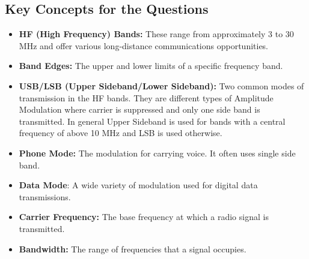\subsection*{Key Concepts for the Questions}
\begin{itemize}
    \item \textbf{HF (High Frequency) Bands:} These range from approximately 3 to 30 MHz and offer various long-distance communications opportunities.
    \item \textbf{Band Edges:}  The upper and lower limits of a specific frequency band.
    \item \textbf{USB/LSB (Upper Sideband/Lower Sideband):} Two common modes of transmission in the HF bands. They are different types of Amplitude Modulation where carrier is suppressed and only one side band is transmitted. In general Upper Sideband is used for bands with a central frequency of above 10 MHz and LSB is used otherwise.
    \item \textbf{Phone Mode:} The modulation for carrying voice. It often uses single side band.
    \item \textbf{Data Mode}: A wide variety of modulation used for digital data transmissions.
    \item \textbf{Carrier Frequency:} The base frequency at which a radio signal is transmitted.
    \item \textbf{Bandwidth:} The range of frequencies that a signal occupies.
\end{itemize}

